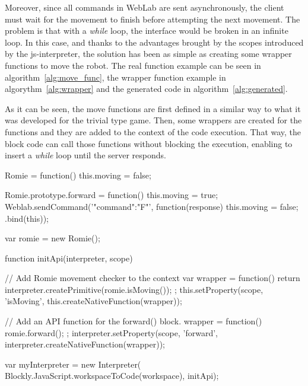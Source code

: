 Moreover, since all commands in WebLab are sent asynchronously, the client must wait for the
movement to finish before attempting the next movement. The problem is that with a \emph{while}
loop, the interface would be broken in an infinite loop. In this case, and thanks to the advantages
brought by the scopes introduced by the \acrshort{js}-interpreter, the solution has been as simple
as creating some wrapper functions to move the robot. The real function example can be seen in
algorithm~\ref{alg:move_func}, the wrapper function example in algorythm~\ref{alg:wrapper} and the
generated code in algorithm~\ref{alg:generated}.

As it can be seen, the move functions are first defined in a similar way to what it was developed
for the trivial type game. Then, some wrappers are created for the functions and they are added to
the context of the code execution. That way, the block code can call those functions without
blocking the execution, enabling to insert a \emph{while} loop until the server responds.

\begin{center}
\begin{minipage}{.9\textwidth}
\singlespace
{}
\begin{pyglist}[language=javascript, caption={Robot movement function.},
	label={alg:move_func}, listingname={Algorithm}, numbers=left]
Romie = function() {
    this.moving = false;
}

Romie.prototype.forward = function() {
    this.moving = true;
    Weblab.sendCommand('{"command":"F"}', function(response) {
        this.moving = false;
    }.bind(this));
}

var romie = new Romie();
\end{pyglist}
\end{minipage}
\end{center}

\begin{center}
\begin{minipage}{.9\textwidth}
\singlespace
{}
\begin{pyglist}[language=javascript, caption={Function wrapper.},
	label={alg:wrapper}, listingname={Algorithm}, numbers=left]
function initApi(interpreter, scope) {
	// Add Romie movement checker to the context
	var wrapper = function() {
		return interpreter.createPrimitive(romie.isMoving());
	};
	this.setProperty(scope, 'isMoving',
		this.createNativeFunction(wrapper));

	// Add an API function for the forward() block.
	wrapper = function() {
		romie.forward();
	};
	interpreter.setProperty(scope, 'forward',
		interpreter.createNativeFunction(wrapper));
}
var myInterpreter = new Interpreter(
	Blockly.JavaScript.workspaceToCode(workspace),
	initApi);
\end{pyglist}
\end{minipage}
\end{center}

